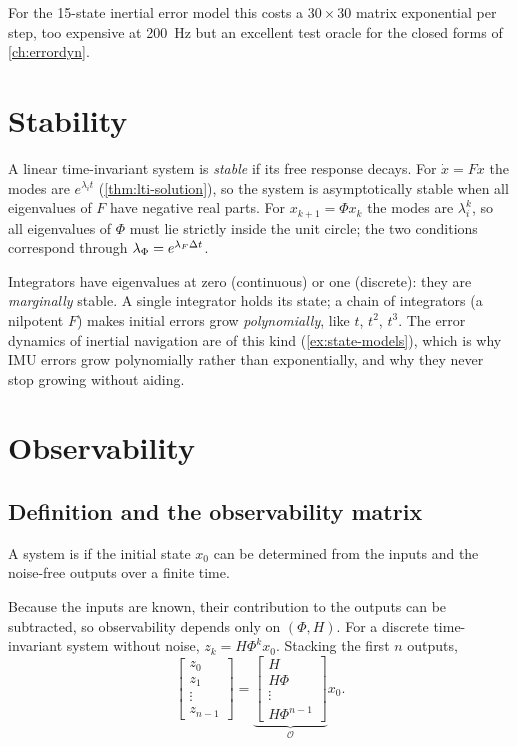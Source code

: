 For the 15-state inertial error model this costs a $30\times30$ matrix exponential per step, too expensive at 200~Hz but an excellent test oracle for the
closed forms of \cref{ch:errordyn}.

\section{Stability}

A linear time-invariant system is \emph{stable} if its free response decays. For $\dot x = Fx$ the modes are $e^{\lambda_it}$ (\cref{thm:lti-solution}), so the
system is asymptotically stable when all eigenvalues of $F$ have negative real parts. For $x_{k+1} = \Phi x_k$ the modes are $\lambda_i^k$, so all eigenvalues of
$\Phi$ must lie strictly inside the unit circle; the two conditions correspond through $\lambda_\Phi = e^{\lambda_F{\Delta t}}$.

Integrators have eigenvalues at zero (continuous) or one (discrete): they are \emph{marginally} stable. A single integrator holds its state; a chain of
integrators (a nilpotent $F$) makes initial errors grow \emph{polynomially}, like $t$, $t^2$, $t^3$. The error dynamics of inertial navigation are of this
kind (\cref{ex:state-models}), which is why IMU errors grow polynomially rather than exponentially, and why they never stop growing without aiding.

\section{Observability}
\label{sec:observability-linear}

\subsection{Definition and the observability matrix}

\begin{definition}[Observability]
A system is  if the initial state $x_0$ can be determined from the inputs and the noise-free outputs over a finite time.
\end{definition}

Because the inputs are known, their contribution to the outputs can be subtracted, so observability depends only on $(\Phi, H)$. For a discrete
time-invariant system without noise, $z_k = H\Phi^kx_0$. Stacking the first $n$ outputs,
\begin{equation}
  \begin{bmatrix} z_0 \\ z_1 \\ \vdots \\ z_{n-1}\end{bmatrix} = \underbrace{\begin{bmatrix} H \\ H\Phi \\ \vdots \\ H\Phi^{n-1}\end{bmatrix}}_{\mathcal O}x_0 .
\end{equation}

